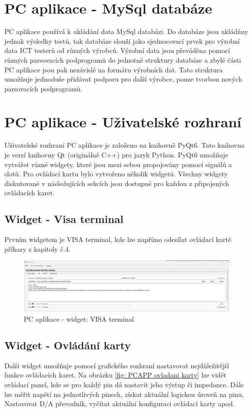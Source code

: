 \section{PC aplikace - MySql databáze}
PC aplikace používá k ukládání data MySql databázi. Do databáze jsou ukládány jednak výsledky testů, tak databáze slouží jako sjednocovací
prvek pro výrobní data ICT testerů od různých výrobců. 
Výrobní data jsou převáděna pomocí různých parsovacích podprogramů do jednotné struktury databáze a zbylé části PC aplikace jsou pak nezávislé na
formátu výrobních dat. Tato struktura umožňuje jednoduše přidávat podporu pro další výrobce, pouze tvorbou nových parsovacích podprogramů.

\section{PC aplikace - Uživatelské rozhraní}
Uživatelské rozhraní PC aplikace je založeno na knihovně PyQt6. Tato knihovna je verzí knihovny Qt (originálně C++) pro jazyk Python.
PyQt6 umožňuje vytvářet různé widgety, které jsou mezi sebou propojovány pomocí signálů a slotů. Pro ovládací kartu bylo vytvořeno několik
widgetů. Všechny widgety diskutované v následujících sekcích jsou dostupné pro každou z připojených ovládacích karet.

\subsection{Widget - Visa terminal}
Prvním widgetem je VISA terminal, kde lze napřímo odesílat ovládací kartě příkazy z kapitoly č.4.

\begin{figure}[ht!]
    \centering
    \includegraphics[width = 1\textwidth]{obrazky/PC_APP_VISA.png}
    \caption{PC aplikace - widget: VISA terminal}
    \label{fig: PCAPP VISA terminal}
\end{figure}

\subsection{Widget - Ovládání karty}
Další widget umožňuje pomocí grafického rozhraní nastavovat nejdůležitější funkce ovládacích karet. Na obrázku \ref{fig: PCAPP ovladani karty} lze vidět
ovládací panel, kde se pro každý pin dá nastavit jeho výstup či impedance.
Dále lze měřit napětí na jednotlivých pinech, získat aktuální logickou úroveň na pinu,
Nastavovat D/A převodník, vyčítat aktuální konfiguraci ovládací karty apod.

